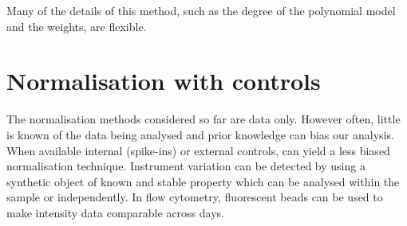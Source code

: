 Many of the details of this method, such as the degree of the polynomial model and the weights, are flexible.


%



\section{Normalisation with controls}

The normalisation methods considered so far are data only.
However often, little is known of the data being analysed and prior knowledge can bias our analysis.
When available internal (spike-ins) or external controls, can yield a less biased normalisation technique.
Instrument variation can be detected by using a synthetic object of known and stable property which can be analysed within the sample
or independently.
In flow cytometry, fluorescent beads can be used to make intensity data comparable across days. 



